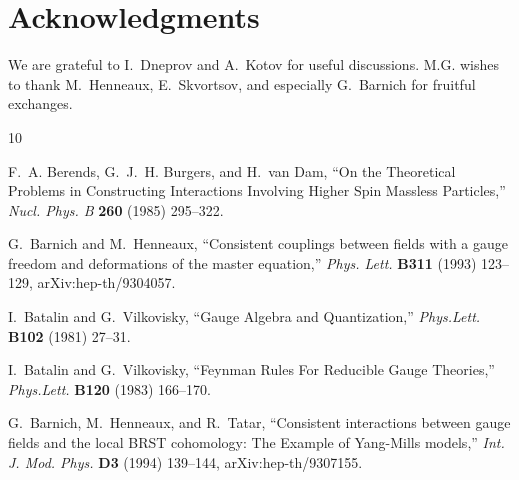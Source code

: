 \documentclass[a4paper,12pt]{article}
\numberwithin{equation}{section} %
\begin{document}
\section*{Acknowledgments}
\label{sec:Aknowledgements}
We are grateful to I.~Dneprov and A.~Kotov for useful discussions. 
M.G. wishes to thank  M.~Henneaux, E.~Skvortsov, and especially G.~Barnich for fruitful exchanges.




\setlength{\itemsep}{1pt}
\small

%
\providecommand{\href}[2]{#2}\begingroup\raggedright\begin{thebibliography}{10}

F.~A. Berends, G.~J.~H. Burgers, and H.~van Dam, ``{On the Theoretical Problems in Constructing Interactions Involving Higher Spin Massless Particles},'' \href{http://dx.doi.org/10.1016/0550-3213(85)90074-4}{{\em Nucl. Phys. B} {\bfseries 260} (1985) 295--322}.

G.~Barnich and M.~Henneaux, ``{C}onsistent couplings between fields with a gauge freedom and deformations of the master equation,'' \href{http://dx.doi.org/10.1016/0370-2693(93)90544-R}{{\em Phys. Lett.} {\bfseries B311} (1993) 123--129},
\href{http://arxiv.org/abs/hep-th/9304057}{{\ttfamily arXiv:hep-th/9304057}}.

I.~Batalin and G.~Vilkovisky, ``{G}auge {A}lgebra and {Q}uantization,''
\href{http://dx.doi.org/10.1016/0370-2693(81)90205-7}{{\em Phys.Lett.} {\bfseries B102} (1981) 27--31}.

I.~Batalin and G.~Vilkovisky, ``{F}eynman {R}ules {F}or {R}educible {G}auge {T}heories,''
\href{http://dx.doi.org/10.1016/0370-2693(83)90645-7}{{\em Phys.Lett.} {\bfseries B120} (1983) 166--170}.

G.~Barnich, M.~Henneaux, and R.~Tatar, ``{C}onsistent interactions between gauge fields and the local {BRST} cohomology: {T}he {E}xample of {Y}ang-{M}ills models,'' \href{http://dx.doi.org/10.1142/S0218271894000149}{{\em Int. J. Mod. Phys.} {\bfseries D3} (1994) 139--144},
\href{http://arxiv.org/abs/hep-th/9307155}{{\ttfamily arXiv:hep-th/9307155}}.


\end{thebibliography}
\end{document}
